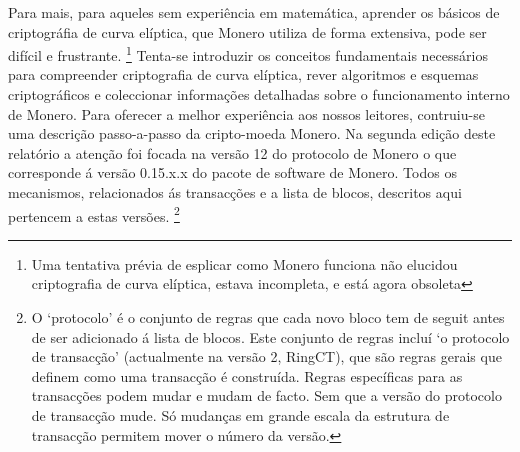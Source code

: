 Para mais, para aqueles sem experiência em matemática, aprender os básicos de criptográfia de curva elíptica, que Monero utiliza de forma extensiva, pode ser difícil e frustrante.
\footnote{Uma tentativa prévia de esplicar como Monero funciona \cite{MRL-0003-about-monero} não elucidou criptografia de curva elíptica, estava incompleta, e está agora obsoleta}
Tenta-se introduzir os conceitos fundamentais necessários para compreender criptografia de curva elíptica, rever algoritmos e esquemas criptográficos e coleccionar informações detalhadas sobre o funcionamento interno de Monero.
Para oferecer a melhor experiência aos nossos leitores, contruiu-se uma descrição passo-a-passo da cripto-moeda Monero. Na segunda edição deste relatório a atenção foi focada na versão 12 do protocolo de Monero
o que corresponde á versão 0.15.x.x do pacote de software de Monero. Todos os mecanismos, relacionados ás transacções e a lista de blocos, descritos aqui pertencem a estas versões.
\footnote{O `protocolo' é o conjunto de regras que cada novo bloco tem de seguit antes de ser adicionado á lista de blocos. Este conjunto de regras incluí `o protocolo de transacção' (actualmente na versão 2, RingCT), que são regras gerais que definem como uma transacção é construída. Regras específicas para as transacções podem mudar e mudam de facto. Sem que a versão do protocolo de transacção mude. Só mudanças em grande escala da estrutura de transacção permitem mover o número da versão.}  
